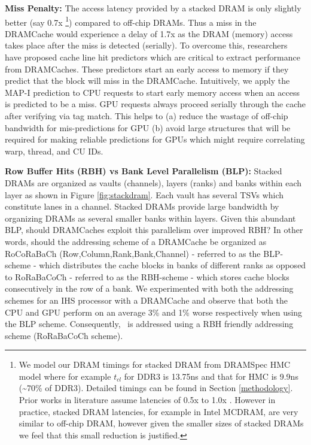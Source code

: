 \par \textbf{Miss Penalty:} The access latency provided by a stacked DRAM is only slightly better (say 0.7x
\footnote{We model our DRAM timings for stacked DRAM from DRAMSpec\cite{dramspec} HMC model where for example $t_{cl}$ for DDR3 is 13.75ns and that for HMC is 9.9ns (\textasciitilde70\% of DDR3). Detailed timings can be found in Section \ref{methodology}. Prior works in literature assume latencies of 0.5x \cite{alloy} to 1.0x \cite{mainak-hpca}. However in practice, stacked DRAM latencies, for example in Intel MCDRAM\cite{xeonphi}, are very similar to off-chip DRAM, however given the smaller sizes of stacked DRAMs we feel that this small reduction is justified.}) compared to off-chip DRAMs. Thus a miss in the DRAMCache would experience a delay of 1.7x as the DRAM (memory) access takes place after the miss is detected (serially). To overcome this, researchers have proposed cache line hit predictors \cite{loh-hill,alloy} which are critical to extract performance from DRAMCaches. These predictors start an early access to memory if they predict that the block will miss in the DRAMCache. Intuitively, we apply the MAP-I prediction \cite{alloy} to CPU requests to start early memory access when an access is predicted to be a miss. GPU requests always proceed serially through the cache after verifying via tag match. This helps to (a) reduce the wastage of off-chip bandwidth for mis-predictions for GPU (b) avoid large structures that will be required for making reliable predictions for GPUs which might require correlating warp, thread, and CU IDs.

\par \textbf{Row Buffer Hits (RBH) vs Bank Level Parallelism (BLP):} Stacked DRAMs are organized as vaults (channels), layers (ranks) and banks within each layer as shown in Figure \ref{fig:stackdram}. Each vault has several TSVs which constitute lanes in a channel. Stacked DRAMs provide large bandwidth by organizing DRAMs as several smaller banks within layers. Given this abundant BLP, should DRAMCaches exploit this parallelism over improved RBH? In other words, should the addressing scheme of a DRAMCache be organized as RoCoRaBaCh (Row,Column,Rank,Bank,Channel) - referred to as the BLP-scheme - which distributes the cache blocks in banks of different ranks as opposed to RoRaBaCoCh - referred to as the RBH-scheme - which stores cache blocks consecutively in the row of a bank. We experimented with both the addressing schemes for an IHS processor with a DRAMCache and observe that both the CPU and GPU perform on an average 3\% and 1\% worse respectively when using the BLP scheme. Consequently, \cachename\ is addressed using a RBH friendly addressing scheme (RoRaBaCoCh scheme). 

